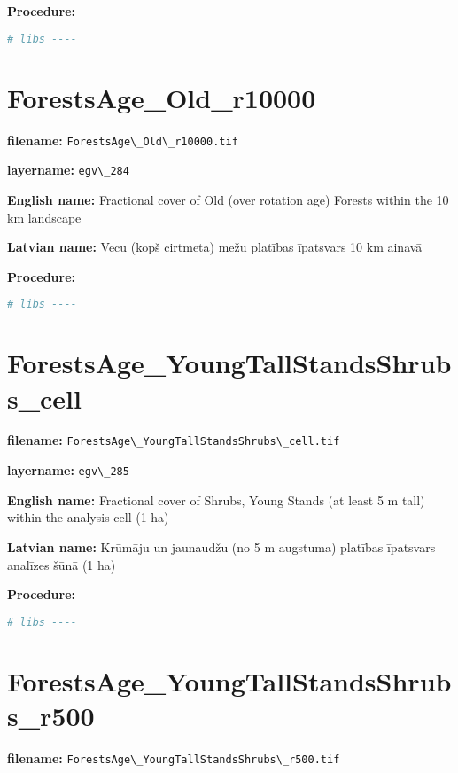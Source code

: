 \documentclass[
]{book}
\newcommand{\passthrough}[1]{#1}
\begin{document}
\textbf{Procedure:}

\begin{lstlisting}[language=R]
# libs ----
\end{lstlisting}

\section{ForestsAge\_Old\_r10000}\label{ch06.284}

\textbf{filename:} \passthrough{\lstinline!ForestsAge\_Old\_r10000.tif!}

\textbf{layername:} \passthrough{\lstinline!egv\_284!}

\textbf{English name:} Fractional cover of Old (over rotation age) Forests within the 10 km landscape

\textbf{Latvian name:} Vecu (kopš cirtmeta) mežu platības īpatsvars 10 km ainavā

\textbf{Procedure:}

\begin{lstlisting}[language=R]
# libs ----
\end{lstlisting}

\section{ForestsAge\_YoungTallStandsShrubs\_cell}\label{ch06.285}

\textbf{filename:} \passthrough{\lstinline!ForestsAge\_YoungTallStandsShrubs\_cell.tif!}

\textbf{layername:} \passthrough{\lstinline!egv\_285!}

\textbf{English name:} Fractional cover of Shrubs, Young Stands (at least 5 m tall) within the analysis cell (1 ha)

\textbf{Latvian name:} Krūmāju un jaunaudžu (no 5 m augstuma) platības īpatsvars analīzes šūnā (1 ha)

\textbf{Procedure:}

\begin{lstlisting}[language=R]
# libs ----
\end{lstlisting}

\section{ForestsAge\_YoungTallStandsShrubs\_r500}\label{ch06.286}

\textbf{filename:} \passthrough{\lstinline!ForestsAge\_YoungTallStandsShrubs\_r500.tif!}
\end{document}
